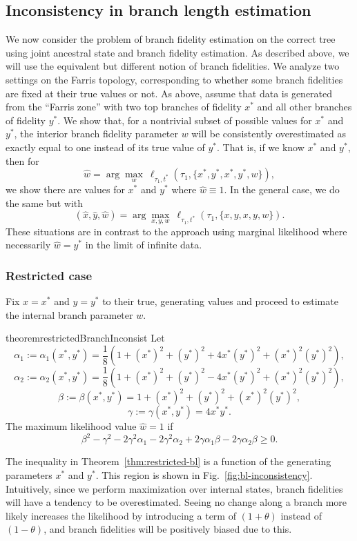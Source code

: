 \documentclass{article}
\begin{document}
\subsection*{Inconsistency in branch length estimation}

We now consider the problem of branch fidelity estimation on the correct tree using joint ancestral state and branch fidelity estimation.
As described above, we will use the equivalent but different notion of branch fidelities.
We analyze two settings on the Farris topology, corresponding to whether some branch fidelities are fixed at their true values or not.
As above, assume that data is generated from the ``Farris zone'' with two top branches of fidelity $x^*$ and all other branches of fidelity $y^*$.
We show that, for a nontrivial subset of possible values for $x^*$ and $y^*$, the interior branch fidelity parameter $w$ will be consistently overestimated as exactly equal to one instead of its true value of $y^*$.
That is, if we know $x^*$ and $y^*$, then for
$$
\hat{w} = \arg\max_{w} \ \ell_{\tau_1,t^*}(\tau_1, \{x^*,y^*,x^*,y^*,w\}),
$$
we show there are values for $x^*$ and $y^*$ where $\hat{w}\equiv 1$.
In the general case, we do the same but with
$$
(\hat{x}, \hat{y}, \hat{w}) = \arg\max_{x,y,w} \ \ell_{\tau_1,t^*}(\tau_1, \{x,y,x,y,w\}).
$$
These situations are in contrast to the approach using marginal likelihood where necessarily $\hat{w}=y^*$ in the limit of infinite data.

\subsubsection*{Restricted case}

Fix $x=x^*$ and $y=y^*$ to their true, generating values and proceed to estimate the internal branch parameter $w$.
\begin{restatable}{theorem}{restrictedBranchInconsist}
\label{thm:restricted-bl}
Let
$$
\alpha_1 := \alpha_1(x^*, y^*) = \frac{1}{8} \left(1+(x^*)^2+(y^*)^2+4x^*(y^*)^2+(x^*)^2(y^*)^2\right),
$$
$$
\alpha_2 := \alpha_2(x^*, y^*) = \frac{1}{8}\left(1+(x^*)^2+(y^*)^2-4x^*(y^*)^2+(x^*)^2(y^*)^2\right),
$$
$$
\beta := \beta(x^*, y^*) = 1+(x^*)^2+(y^*)^2+(x^*)^2(y^*)^2,
$$
$$
\gamma := \gamma(x^*, y^*) = 4x^*y^*.
$$
The maximum likelihood value $\hat{w} = 1$ if
$$
\beta^2-\gamma^2-2\gamma^2\alpha_1-2\gamma^2\alpha_2+2\gamma\alpha_1\beta-2\gamma\alpha_2\beta \ge 0.
$$
\end{restatable}
The inequality in Theorem~\ref{thm:restricted-bl} is a function of the generating parameters $x^*$ and $y^*$.
This region is shown in Fig.~\ref{fig:bl-inconsistency}.
Intuitively, since we perform maximization over internal states, branch fidelities will have a tendency to be overestimated.
Seeing no change along a branch more likely increases the likelihood by introducing a term of $(1+\theta)$ instead of $(1-\theta)$, and branch fidelities will be positively biased due to this.
\end{document}
